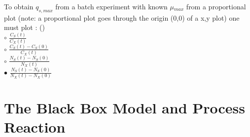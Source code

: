 \documentclass[]{beamer}
\begin{document}
\begin{frame}[shrink] {} 
\color{blue}
    
 To obtain $q_{s,max}$ from a batch experiment with known $\mu$$_{max}$ from a proportional plot (note: a proportional plot goes through the origin (0,0) of a x,y plot) one must plot :  ({\color{green}{Q11}})\\[0.5em]
\color{black}
\setlength{\parindent}{-0.4cm}
{\color{red}$\circ$} $\frac{C_S(t)}{C_X(t)}$  \\[0.3em]
{\color{red}$\circ$} $\frac{C_S(t)-C_S(0)}{C_X(t)}$  \\[0.3em]
{\color{red}$\circ$} $\frac{N_S(t)-N_S(0)}{N_X(t)}$  \\[0.3em]
{\color{red}$\bullet$} $\frac{N_S(t)-N_S(0)}{N_X(t)-N_X(0)}$  \\[0.3em]
\end{frame}


\section{The Black Box Model and Process Reaction}
\end{document}
